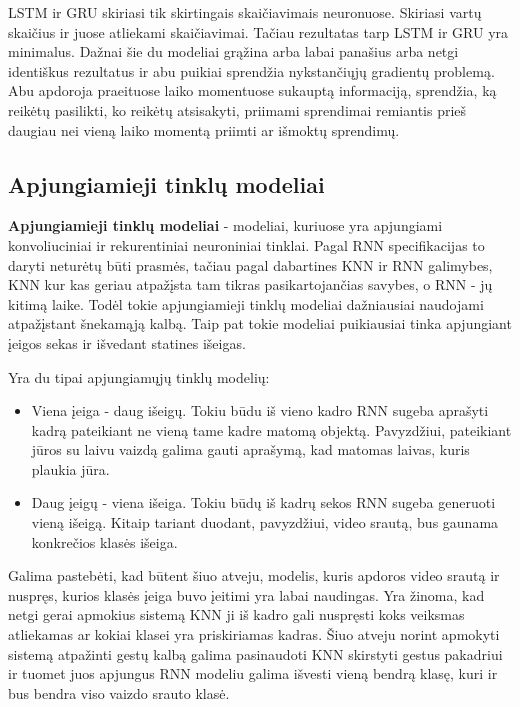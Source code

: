 \documentclass{VUMIFPSbakalaurinis}
\begin{document}

LSTM ir GRU skiriasi tik skirtingais skaičiavimais neuronuose. Skiriasi vartų skaičius ir juose atliekami skaičiavimai. Tačiau rezultatas tarp LSTM ir GRU yra minimalus. Dažnai šie du modeliai grąžina arba labai panašius arba netgi identiškus rezultatus ir abu puikiai sprendžia nykstančiųjų gradientų problemą. Abu apdoroja praeituose laiko momentuose sukauptą informaciją, sprendžia, ką reikėtų pasilikti, ko reikėtų atsisakyti, priimami sprendimai remiantis prieš daugiau nei vieną laiko momentą priimti ar išmoktų sprendimų. 

\subsection{Apjungiamieji tinklų modeliai}

\textbf{Apjungiamieji tinklų modeliai} - modeliai, kuriuose yra apjungiami konvoliuciniai ir rekurentiniai neuroniniai tinklai. Pagal RNN specifikacijas to daryti neturėtų būti prasmės, tačiau pagal dabartines KNN ir RNN galimybes, KNN kur kas geriau atpažįsta tam tikras pasikartojančias savybes, o RNN - jų kitimą laike. Todėl tokie apjungiamieji tinklų modeliai dažniausiai naudojami atpažįstant šnekamąją kalbą. Taip pat tokie modeliai puikiausiai tinka apjungiant įeigos sekas ir išvedant statines išeigas. 

Yra du tipai apjungiamųjų tinklų modelių:
\begin{itemize}
	\item Viena įeiga - daug išeigų. Tokiu būdu iš vieno kadro RNN sugeba aprašyti kadrą pateikiant ne vieną tame kadre matomą objektą. Pavyzdžiui, pateikiant jūros su laivu vaizdą galima gauti aprašymą, kad matomas laivas, kuris plaukia jūra.
	\item Daug įeigų - viena išeiga. Tokiu būdų iš kadrų sekos RNN sugeba generuoti vieną išeigą. Kitaip tariant duodant, pavyzdžiui, video srautą, bus gaunama konkrečios klasės išeiga.
\end{itemize}

Galima pastebėti, kad būtent šiuo atveju, modelis, kuris apdoros video srautą ir nuspręs, kurios klasės įeiga buvo įeitimi yra labai naudingas. Yra žinoma, kad netgi gerai apmokius sistemą KNN ji iš kadro gali nuspręsti koks veiksmas atliekamas ar kokiai klasei yra priskiriamas kadras. Šiuo atveju norint apmokyti sistemą atpažinti gestų kalbą galima pasinaudoti KNN skirstyti gestus pakadriui ir tuomet juos apjungus RNN modeliu galima išvesti vieną bendrą klasę, kuri ir bus bendra viso vaizdo srauto klasė.
\end{document}
